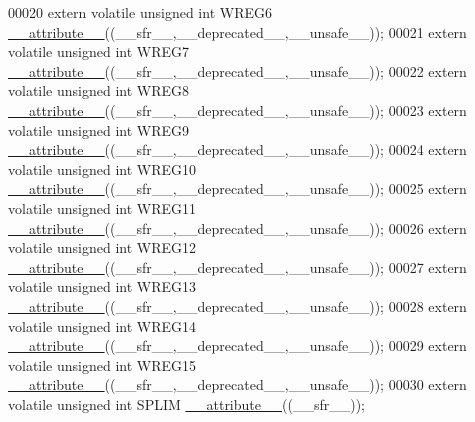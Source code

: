 \begin{DoxyCode}
00020 \textcolor{keyword}{extern} \textcolor{keyword}{volatile} \textcolor{keywordtype}{unsigned} \textcolor{keywordtype}{int}  WREG6 \hyperlink{a00015_a493c46f03454991ccc5aa7a6e1dfb2a7}{\_\_attribute\_\_}((\_\_sfr\_\_,\_\_deprecated\_\_,\_\_unsafe\_\_));
00021 \textcolor{keyword}{extern} \textcolor{keyword}{volatile} \textcolor{keywordtype}{unsigned} \textcolor{keywordtype}{int}  WREG7 \hyperlink{a00015_a493c46f03454991ccc5aa7a6e1dfb2a7}{\_\_attribute\_\_}((\_\_sfr\_\_,\_\_deprecated\_\_,\_\_unsafe\_\_));
00022 \textcolor{keyword}{extern} \textcolor{keyword}{volatile} \textcolor{keywordtype}{unsigned} \textcolor{keywordtype}{int}  WREG8 \hyperlink{a00015_a493c46f03454991ccc5aa7a6e1dfb2a7}{\_\_attribute\_\_}((\_\_sfr\_\_,\_\_deprecated\_\_,\_\_unsafe\_\_));
00023 \textcolor{keyword}{extern} \textcolor{keyword}{volatile} \textcolor{keywordtype}{unsigned} \textcolor{keywordtype}{int}  WREG9 \hyperlink{a00015_a493c46f03454991ccc5aa7a6e1dfb2a7}{\_\_attribute\_\_}((\_\_sfr\_\_,\_\_deprecated\_\_,\_\_unsafe\_\_));
00024 \textcolor{keyword}{extern} \textcolor{keyword}{volatile} \textcolor{keywordtype}{unsigned} \textcolor{keywordtype}{int}  WREG10 \hyperlink{a00015_a493c46f03454991ccc5aa7a6e1dfb2a7}{\_\_attribute\_\_}((\_\_sfr\_\_,\_\_deprecated\_\_,\_\_unsafe\_\_));
00025 \textcolor{keyword}{extern} \textcolor{keyword}{volatile} \textcolor{keywordtype}{unsigned} \textcolor{keywordtype}{int}  WREG11 \hyperlink{a00015_a493c46f03454991ccc5aa7a6e1dfb2a7}{\_\_attribute\_\_}((\_\_sfr\_\_,\_\_deprecated\_\_,\_\_unsafe\_\_));
00026 \textcolor{keyword}{extern} \textcolor{keyword}{volatile} \textcolor{keywordtype}{unsigned} \textcolor{keywordtype}{int}  WREG12 \hyperlink{a00015_a493c46f03454991ccc5aa7a6e1dfb2a7}{\_\_attribute\_\_}((\_\_sfr\_\_,\_\_deprecated\_\_,\_\_unsafe\_\_));
00027 \textcolor{keyword}{extern} \textcolor{keyword}{volatile} \textcolor{keywordtype}{unsigned} \textcolor{keywordtype}{int}  WREG13 \hyperlink{a00015_a493c46f03454991ccc5aa7a6e1dfb2a7}{\_\_attribute\_\_}((\_\_sfr\_\_,\_\_deprecated\_\_,\_\_unsafe\_\_));
00028 \textcolor{keyword}{extern} \textcolor{keyword}{volatile} \textcolor{keywordtype}{unsigned} \textcolor{keywordtype}{int}  WREG14 \hyperlink{a00015_a493c46f03454991ccc5aa7a6e1dfb2a7}{\_\_attribute\_\_}((\_\_sfr\_\_,\_\_deprecated\_\_,\_\_unsafe\_\_));
00029 \textcolor{keyword}{extern} \textcolor{keyword}{volatile} \textcolor{keywordtype}{unsigned} \textcolor{keywordtype}{int}  WREG15 \hyperlink{a00015_a493c46f03454991ccc5aa7a6e1dfb2a7}{\_\_attribute\_\_}((\_\_sfr\_\_,\_\_deprecated\_\_,\_\_unsafe\_\_));
00030 \textcolor{keyword}{extern} \textcolor{keyword}{volatile} \textcolor{keywordtype}{unsigned} \textcolor{keywordtype}{int}  SPLIM \hyperlink{a00015_a493c46f03454991ccc5aa7a6e1dfb2a7}{\_\_attribute\_\_}((\_\_sfr\_\_));

\end{DoxyCode}
